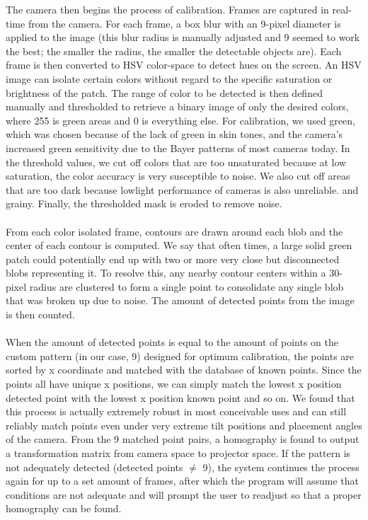 \documentclass[twoside,twocolumn]{article}
\begin{document}
The camera then begins the process of calibration. Frames are captured in real-time from the camera. For each frame, a box blur with an 9-pixel diameter is applied to the image (this blur radius is manually adjusted and 9 seemed to work the best; the smaller the radius, the smaller the detectable objects are). Each frame is then converted to HSV color-space to detect hues on the screen. An HSV image can isolate certain colors without regard to the specific saturation or brightness of the patch. The range of color to be detected is then defined manually and thresholded to retrieve a binary image of only the desired colors, where 255 is green areas and 0 is everything else. For calibration, we used green, which was chosen because of the lack of green in skin tones, and the camera's increased green sensitivity due to the Bayer patterns of most cameras today. In the threshold values, we cut off colors that are too unsaturated because at low saturation, the color accuracy is very susceptible to noise. We also cut off areas that are too dark because lowlight performance of cameras is also unreliable. and grainy. Finally, the thresholded mask is eroded to remove noise.\\ \\
From each color isolated frame, contours are drawn around each blob and the center of each contour is computed. We say that often times, a large solid green patch could potentially end up with two or more very close but disconnected blobs representing it. To resolve this, any nearby contour centers within a 30-pixel radius are clustered to form a single point to consolidate any single blob that was broken up due to noise. The amount of detected points from the image is then counted. \\ \\
When the amount of detected points is equal to the amount of points on the custom pattern (in our case, 9) designed for optimum calibration, the points are sorted by x coordinate and matched with the database of known points. Since the points all have unique x positions, we can simply match the lowest x position detected point with the lowest x position known point and so on. We found that this process is actually extremely robust in most conceivable uses and can still reliably match points even under very extreme tilt positions and placement angles of the camera. From the 9 matched point pairs, a homography is found to output a transformation matrix from camera space to projector space. If the pattern is not adequately detected (detected points $\neq$ 9), the system continues the process again for up to a set amount of frames, after which the program will assume that conditions are not adequate and will prompt the user to readjust so that a proper homography can be found.\\ \\
\end{document}
